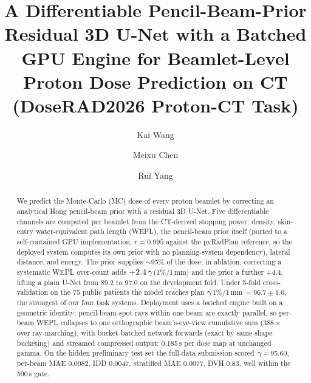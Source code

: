 \documentclass{llncs}
\begin{document}
\title{A Differentiable Pencil-Beam-Prior Residual 3D U-Net with a Batched GPU Engine for
Beamlet-Level Proton Dose Prediction on CT (DoseRAD2026 Proton-CT Task)}
\author{Kai Wang \and Meixu Chen \and Rui Yang}

\maketitle

\begin{abstract}
We predict the Monte-Carlo (MC) dose of every proton beamlet by correcting an analytical Hong
pencil-beam prior with a residual 3D U-Net. Five differentiable channels are computed per
beamlet from the CT-derived stopping power: density, skin-entry water-equivalent path length
(WEPL), the pencil-beam prior itself (ported to a self-contained GPU implementation,
$r{=}0.995$ against the pyRadPlan reference, so the deployed system computes its own prior with
no planning-system dependency), lateral distance, and energy. The prior supplies $\sim$95\% of
the dose; in ablation, correcting a systematic WEPL over-count adds $+2.4\,\gamma$(1\%/1\,mm) and
the prior a further $+4.4$, lifting a plain U-Net from 89.2 to 97.0 on the development fold.
Under 5-fold cross-validation on the 75 public patients the model reaches plan
$\gamma$1\%/1\,mm\,$=96.7\pm1.0$, the strongest of our four task systems. Deployment uses a
batched engine built on a geometric identity; pencil-beam-spot rays within one beam are exactly
parallel, so per-beam WEPL collapses to one orthographic beam's-eye-view cumulative sum
($388\times$ over ray-marching), with bucket-batched network forwards (exact by same-shape
bucketing) and streamed compressed output: 0.185\,s per dose map at unchanged gamma. On the
hidden preliminary test set the full-data submission scored $\gamma$\,=\,95.60, per-beam MAE
0.0082, IDD 0.0047, stratified MAE 0.0077, DVH 0.83, well within the 500\,s gate.
\end{abstract}
\end{document}
